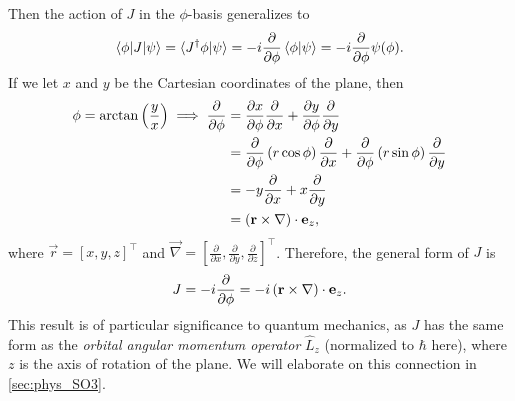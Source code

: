 Then the action of $J$ in the $\phi$-basis generalizes to
\begin{align}
    \braket{\phi|J|\psi} = \braket{J^\dagger \phi|\psi} = -i\frac{\partial}{\partial\phi}\braket{\phi|\psi} = -i\frac{\partial}{\partial\phi}\psi(\phi).
\end{align}
If we let $x$ and $y$ be the Cartesian coordinates of the plane, then
\begin{align}
    \begin{split}        
    \phi = \arctan\left(\frac{y}{x}\right) \implies \frac{\partial}{\partial\phi} 
        &= \frac{\partial x}{\partial \phi}\frac{\partial}{\partial x} + \frac{\partial y}{\partial \phi}\frac{\partial}{\partial y} \\
        &= \frac{\partial}{\partial\phi}\left( r\cos\phi \right)\frac{\partial}{\partial x} + \frac{\partial}{\partial\phi}\left( r\sin\phi \right)\frac{\partial}{\partial y} \\
        &= -y\frac{\partial}{\partial x} + x\frac{\partial}{\partial y} \\
        &= (\mathbf{r}\times\mathbf{\nabla})\cdot\mathbf{e}_z,
    \end{split}
\end{align}
where $\vec{r} = {[x,y,z]}^\top$ and $\vec{\nabla} = {\left[\frac{\partial}{\partial x},\frac{\partial}{\partial y},\frac{\partial}{\partial z}\right]}^\top$. Therefore, the general form of $J$ is
\begin{align}\label{eq:SO2_J}
    J = -i \frac{\partial}{\partial\phi} = -i \left( \mathbf{r}\times\mathbf{\nabla} \right)\cdot\mathbf{e}_z.
\end{align}
This result is of particular significance to quantum mechanics, as $J$ has the same form as the \textit{orbital angular momentum operator} $\hat{L}_z$ (normalized to $\hbar$ here), where $z$ is the axis of rotation of the plane\cite{Hall2013,Griffiths2018}. We will elaborate on this connection in \cref{sec:phys_SO3}.


